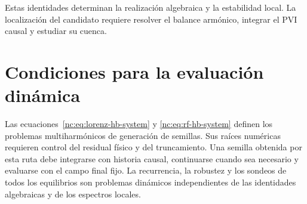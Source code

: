 Estas identidades determinan la realización algebraica y la estabilidad
local. La localización del candidato requiere resolver el balance armónico,
integrar el PVI causal y estudiar su cuenca.

\section{Condiciones para la evaluación dinámica}

Las ecuaciones~\eqref{nc:eq:lorenz-hb-system} y
\eqref{nc:eq:rf-hb-system} definen los problemas multiharmónicos de generación
de semillas. Sus raíces numéricas requieren control del residual físico y
del truncamiento. Una semilla obtenida por esta ruta debe integrarse con
historia causal, continuarse cuando sea necesario y evaluarse con el campo
final fijo. La recurrencia, la robustez y los sondeos de todos los equilibrios
son problemas dinámicos independientes de las identidades algebraicas y de
los espectros locales.
